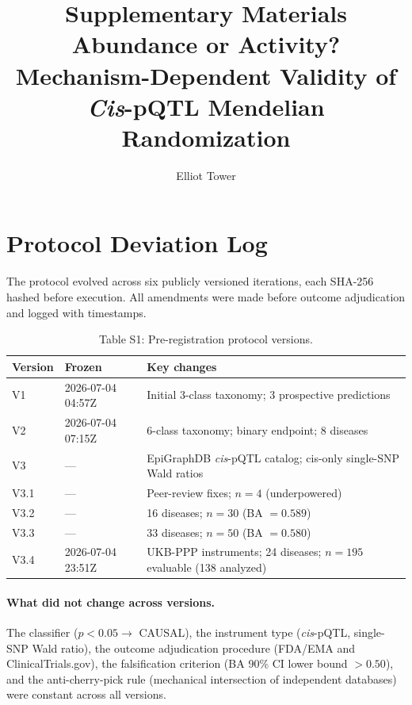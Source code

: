\documentclass[11pt]{article}
\title{Supplementary Materials\\[0.5em]
\large Abundance or Activity? Mechanism-Dependent Validity of \emph{Cis}-pQTL Mendelian Randomization}
\author{Elliot Tower}
\date{}
\begin{document}
\maketitle

\tableofcontents
\clearpage

\section{Protocol Deviation Log}
\label{supp:deviation}

The protocol evolved across six publicly versioned iterations, each SHA-256 hashed before execution. All amendments were made before outcome adjudication and logged with timestamps.

\vspace{1em}
\begin{table}[H]
\centering
\caption{Table S1: Pre-registration protocol versions.}
\label{tab:versions}
\small
\begin{tabular}{llp{6.5cm}}
\toprule
Version & Frozen & Key changes \\
\midrule
V1 & 2026-07-04 04:57Z & Initial 3-class taxonomy; 3 prospective predictions \\
V2 & 2026-07-04 07:15Z & 6-class taxonomy; binary endpoint; 8 diseases \\
V3 & --- & EpiGraphDB \emph{cis}-pQTL catalog; cis-only single-SNP Wald ratios \\
V3.1 & --- & Peer-review fixes; $n = 4$ (underpowered) \\
V3.2 & --- & 16 diseases; $n = 30$ (BA $= 0.589$) \\
V3.3 & --- & 33 diseases; $n = 50$ (BA $= 0.580$) \\
V3.4 & 2026-07-04 23:51Z & UKB-PPP instruments; 24 diseases; $n = 195$ evaluable (138 analyzed) \\
\bottomrule
\end{tabular}
\end{table}

\paragraph{What did not change across versions.}
The classifier ($p < 0.05 \rightarrow$ CAUSAL), the instrument type (\emph{cis}-pQTL, single-SNP Wald ratio), the outcome adjudication procedure (FDA/EMA and ClinicalTrials.gov), the falsification criterion (BA 90\% CI lower bound $> 0.50$), and the anti-cherry-pick rule (mechanical intersection of independent databases) were constant across all versions.
\end{document}
